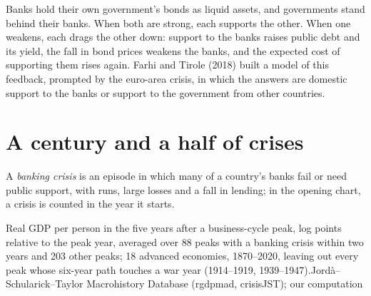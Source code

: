 Banks hold their own government's bonds as liquid assets, and governments stand behind their banks. When both are
strong, each supports the other. When one weakens, each drags the other down: support to the banks raises public debt and
its yield, the fall in bond prices weakens the banks, and the expected cost of supporting them rises again. Farhi and
Tirole (2018) built a model of this feedback, prompted by the euro-area crisis, in which the answers are domestic
support to the banks or support to the government from other countries.

\section{A century and a half of crises}\label{sec:b2:banks-and-crises:record}

\begin{definition}\label{def:b2:banks-and-crises:banking-crisis}
A \emph{banking crisis} is an episode in which many of a country's banks fail or need public
support, with runs, large losses and a fall in lending; in the opening chart, a crisis is counted in the year it starts.
\end{definition}

\begin{omchart}{Real GDP per person in the five years after a business-cycle peak, log points relative to the peak year,
  averaged over 88 peaks with a banking crisis within two years and 203 other peaks; 18 advanced economies, 1870--2020,
  leaving out every peak whose six-year path touches a war year (1914--1919, 1939--1947).}{Jord\`a--Schularick--Taylor Macrohistory Database (rgdpmad, crisisJST); our computation}
\end{omchart}

